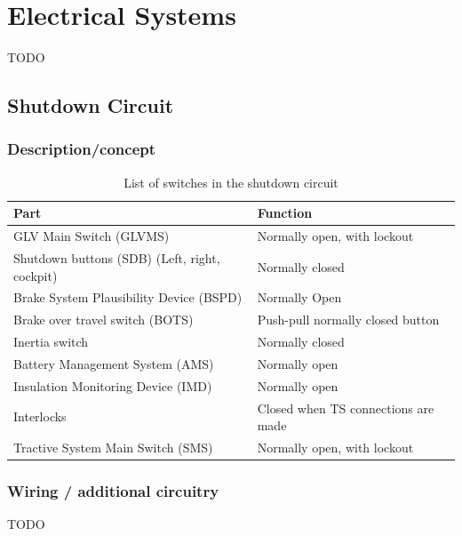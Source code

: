 \documentclass{article}
\begin{document}
\section{Electrical Systems}
TODO

\subsection{Shutdown Circuit}

\subsubsection{Description/concept}

	\begin{table}[H]
        \centering
        \begin{tabular}{|l|l|}
        \hline
            \textbf{Part} & \textbf{Function} \\ \hline
            GLV Main Switch (GLVMS) & Normally open, with lockout \\ \hline
            Shutdown buttons (SDB) (Left, right, cockpit) & Normally closed \\ \hline
            Brake System Plausibility Device (BSPD) & Normally Open \\ \hline
            Brake over travel switch (BOTS) & Push-pull normally closed button \\ \hline
            Inertia switch & Normally closed \\ \hline
            Battery Management System (AMS) & Normally open \\ \hline
            Insulation Monitoring Device (IMD) & Normally open \\ \hline
            Interlocks & Closed when TS connections are made \\ \hline
            Tractive System Main Switch (SMS) & Normally open, with lockout \\ \hline
        \end{tabular}
        \caption{List of switches in the shutdown circuit}
        \label{switchlist}
    \end{table}

\subsubsection{Wiring / additional circuitry}
TODO
\end{document}
